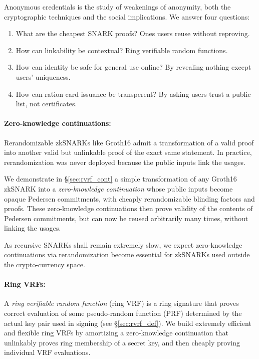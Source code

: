
Anonymous credentials is the study of weakenings of anonymity,
both the cryptographic techniques and the social implications.
%
We answer four questions:
\begin{enumerate} 
\item
What are the cheapest SNARK proofs?  \quad
Ones users reuse without reproving.
\item
How can linkability be contextual?
Ring verifiable random functions.
\item
How can identity be safe for general use online?  \quad
By revealing nothing except users' uniqueness.
\item
How can ration card issuance be transperent?  \quad
By asking users trust a public list, not certificates.
\end{enumerate}

\paragraph{Zero-knowledge continuations:}

Rerandomizable zkSNARKs like Groth16 \cite{Groth16} admit a
transformation of a valid proof into another valid but unlinkable
proof of the exact same statement.  In practice, rerandomization
was never deployed because the public inputs link the usages.

We demonstrate in \S\ref{sec:rvrf_cont} a simple transformation of
any Groth16 zkSNARK into a {\it zero-knowledge continuation} whose
public inputs become opaque Pedersen commitments, with cheaply
rerandomizable blinding factors and proofs.
These zero-knowledge continuations then prove validity of the contents
of Pedersen commitments, but can now be reused arbitrarily many times,
without linking the usages. 

As recursive SNARKs shall remain extremely slow,
we expect zero-knowledge continuations via rerandomization become
essential for zkSNARKs used outside the crypto-currency space.

\paragraph{Ring VRFs:}

A {\it ring verifiable random function} (ring VRF) is a ring signature
that proves correct evaluation of some pseudo-random function (PRF)
determined by the actual key pair used in signing (see \S\ref{sec:rvrf_def}).
We build extremely efficient and flexible ring VRFs by amortizing a
zero-knowledge continuation that unlinkably proves ring membership
of a secret key, and then cheaply proving individual VRF evaluations.

